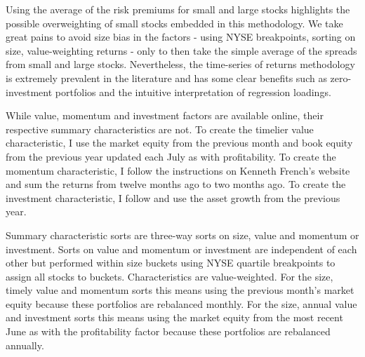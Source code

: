 Using the average of the risk premiums for small and large stocks highlights
the possible overweighting of small stocks embedded in this methodology. We
take great pains to avoid size bias in the factors - using NYSE breakpoints,
sorting on size, value-weighting returns - only to then take the simple average
of the spreads from small and large stocks. Nevertheless, the time-series of
returns methodology is extremely prevalent in the literature and has some clear
benefits such as zero-investment portfolios and the intuitive interpretation of
regression loadings.

While value, momentum and investment factors are available online, their
respective summary characteristics are not. To create the timelier value
characteristic, I use the market equity from the previous month and book equity
from the previous year updated each July as with profitability. To create the
momentum characteristic, I follow the instructions on Kenneth French’s website
and sum the returns from twelve months ago to two months ago. To create the
investment characteristic, I follow \textcite{fama2015five} and use the asset
growth from the previous year.

Summary characteristic sorts are three-way sorts on size, value and momentum or
investment. Sorts on value and momentum or investment are independent of each
other but performed within size buckets using NYSE quartile breakpoints to
assign all stocks to buckets. Characteristics are value-weighted. For the size,
timely value and momentum sorts this means using the previous month’s market
equity because these portfolios are rebalanced monthly. For the size, annual
value and investment sorts this means using the market equity from the most
recent June as with the profitability factor because these portfolios are
rebalanced annually.
